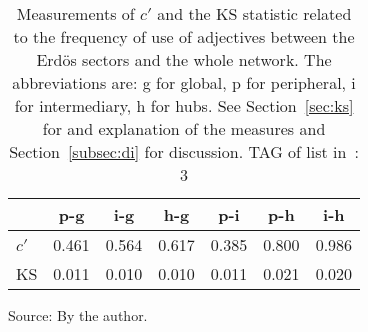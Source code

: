 \begin{table}[h!]
\begin{center}
\caption{Measurements of $c'$ and the KS statistic related to the frequency of use of adjectives between the Erd\"os sectors and the whole network. The abbreviations are: g for global, p for peripheral, i for intermediary, h for hubs. See Section~\ref{sec:ks} for and explanation of the measures and Section~\ref{subsec:di} for discussion. TAG of list in~\cite{textTables}: 3}
\begin{tabular}{| l || c | c | c | c | c | c |}\hline
{\bf } & {\bf p-g} & {\bf i-g} & {\bf h-g} & {\bf p-i} & {\bf p-h} & {\bf i-h} \\\hline\hline
$c'$ & 0.461  & 0.564  & 0.617  & 0.385  & 0.800  & 0.986 \\
KS & 0.011  & 0.010  & 0.010  & 0.011  & 0.021  & 0.020 \\\hline
\end{tabular}
\begin{flushleft}
Source: By the author.\
\end{flushleft}
\end{center}
\end{table}
